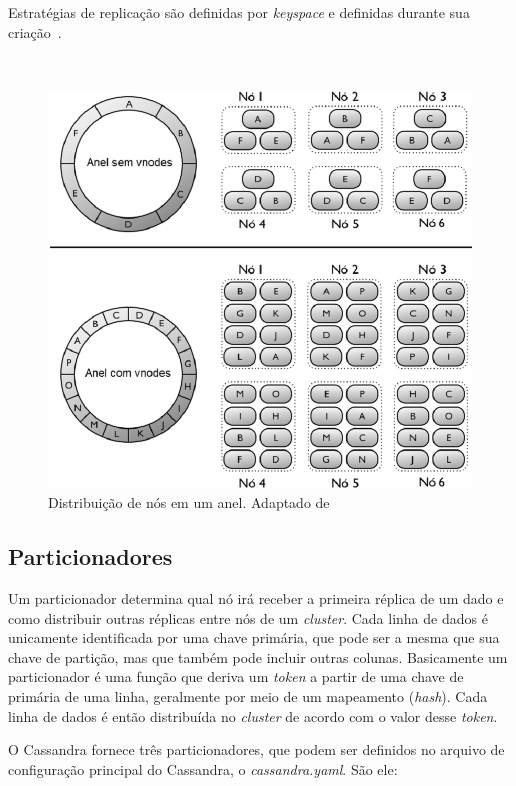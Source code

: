 Estratégias de replicação são definidas por \emph{keyspace} e definidas durante sua criação~\cite{cassandradocs}.

~\begin{figure}[!htb]
\centering
\includegraphics[width=1\textwidth]{figuras/vnodes.png}
\caption{Distribuição de nós em um anel. Adaptado de ~\cite{cassandradocs}}
\label{fig:vnodes}
\end{figure}

\subsection*{Particionadores}
Um particionador determina qual nó irá receber a primeira réplica de um dado e como distribuir outras réplicas entre nós de um \emph{cluster}. Cada linha de dados é unicamente identificada por uma chave primária, que pode ser a mesma que sua chave de partição, mas que também pode incluir outras colunas. Basicamente um particionador é uma função que deriva um \emph{token} a partir de uma chave de primária de uma linha, geralmente por meio de um mapeamento (\emph{hash}). Cada linha de dados é então distribuída no \emph{cluster} de acordo com o valor desse \emph{token}. 

O Cassandra fornece três particionadores, que podem ser definidos no arquivo de configuração principal do Cassandra, o \emph{cassandra.yaml}. São ele:

